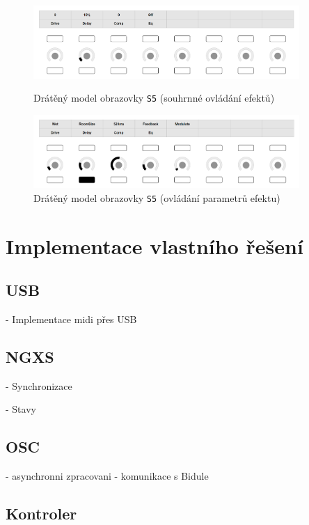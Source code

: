 \documentclass[thesis=M,czech]{FITthesis}[2019/03/06]
\begin{document}
		\begin{figure}
			\centering
			\includegraphics[width=0.9\textwidth]{ControllerUI-EffectOverview}
			\caption{Drátěný model obrazovky \texttt{S5} (souhrnné ovládání efektů)}
			\label{fig:ControllerUI-EffectOverview}			
			\vspace{1.2cm}
			\includegraphics[width=0.9\textwidth]{ControllerUI-EffectDetail}
			\caption{Drátěný model obrazovky \texttt{S5} (ovládání parametrů efektu)}
			\label{fig:ControllerUI-EffectDetail}
		\end{figure}
	
		
\chapter{Implementace vlastního řešení}
	\section{USB}

		- Implementace midi přes USB

	\section{NGXS}
		
		- Synchronizace
		
		- Stavy
		
	\section{OSC}
	
		- asynchronni zpracovani
		- komunikace s Bidule
	
	\section{Kontroler}
	
\end{document}
